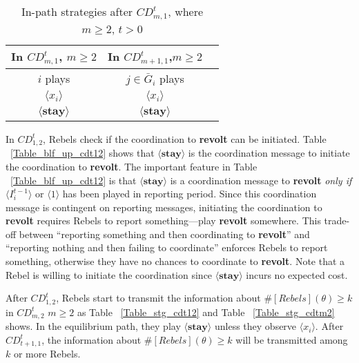 \documentclass[12pt,letterpaper]{article}
\theoremstyle{definition}
\theoremstyle{remark}
\theoremstyle{claim}
\begin{document}
\begin{table}[ht]
\caption{In-path strategies after $CD^t_{m,1}$, where $m\geq 2$, $t>0$}
\label{Table_stg_cdtm1}
\begin{center}
\begin{tabular}{c c c}
In $CD^t_{m,1}$, $m\geq 2$ 	 	&  	In $CD^t_{m+1,1}$,$m\geq 2$		& 	\\
\hline
\hline
$i$ plays 		  							&  $j\in \bar{G}_{i}$ plays  								& \\
\hline
$\langle x_i \rangle$ 	& 	$\langle x_i \rangle$	    &  \\
$\langle \textbf{stay} \rangle$		&  $\langle \textbf{stay} \rangle$	&  \\

\end{tabular}
\end{center}
\end{table}



In $CD^t_{1,2}$, Rebels check if the coordination to \textbf{revolt} can be initiated. Table ~\ref{Table_blf_up_cdt12} shows that $\langle \textbf{stay} \rangle$ is the coordination message to initiate the coordination to \textbf{revolt}. The important feature in Table ~\ref{Table_blf_up_cdt12} is that $\langle \textbf{stay} \rangle$ is a coordination message to \textbf{revolt} \textit{only if} $\langle  {I^{t-1}_i} \rangle$ or $\langle 1 \rangle$ has been played in reporting period.  Since this coordination message is contingent on reporting messages, initiating the coordination to \textbf{revolt} requires Rebels to report something---play \textbf{revolt} somewhere. This trade-off between ``reporting something and then coordinating to \textbf{revolt}'' and ``reporting nothing and then failing to coordinate'' enforces Rebels to report something, otherwise they have no chances to coordinate to \textbf{revolt}. Note that a Rebel is willing to initiate the coordination since $\langle \textbf{stay} \rangle$ incurs no expected cost. 

After $CD^t_{1,2}$, Rebels start to transmit the information about $\#[Rebels](\theta)\geq k$ in $CD^t_{m,2}$ $m\geq 2$ as Table ~\ref{Table_stg_cdt12} and Table ~\ref{Table_stg_cdtm2} shows. In the equilibrium path, they play $\langle \textbf{stay} \rangle$ unless they observe $\langle x_i \rangle$. After $CD^t_{{t+1},1}$, the information about $\#[Rebels](\theta)\geq k$ will be transmitted among $k$ or more Rebels. 
\end{document}
